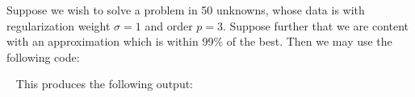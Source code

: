 \documentclass{galahad}
\begin{document}

\galexample
Suppose we wish to solve a problem in 50 unknowns, whose data is
with regularization weight $\sigma = 1$ and order $p = 3$.
Suppose further that we are content with
an approximation which is within 99\% of the best.
Then we may use the following code:

{\tt \small
\VerbatimInput{\packageexample}
}
\noindent
This produces the following output:
{\tt \small
\VerbatimInput{\packageresults}
}
\end{document}
